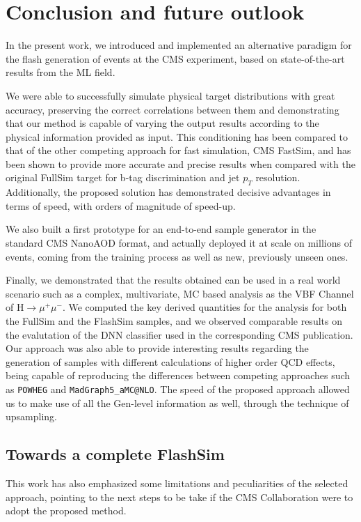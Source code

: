 \chapter{Conclusion and future outlook}\label{ch:outlook} %
In the present work, we introduced and implemented an alternative paradigm for the flash generation of events at the CMS experiment, based on state-of-the-art results from the ML field.

We were able to successfully simulate physical target distributions with great accuracy, preserving the correct correlations between them and demonstrating that our method is capable of varying the output results according to the physical information provided as input. This conditioning has been compared to that of the other competing approach for fast simulation, CMS FastSim, and has been shown to provide more accurate and precise results when compared with the original FullSim target for b-tag discrimination and jet $p_T$ resolution. Additionally, the proposed solution has demonstrated decisive advantages in terms of speed, with orders of magnitude of speed-up.

We also built a first prototype for an end-to-end sample generator in the standard CMS NanoAOD format, and actually deployed it at scale on millions of events, coming from the training process as well as new, previously unseen ones. 

Finally, we demonstrated that the results obtained can be used in a real world scenario such as a complex, multivariate, MC based analysis as the VBF Channel of H$\rightarrow\mu^+\mu^-$. We computed the key derived quantities for the analysis for both the FullSim and the FlashSim samples, and we observed comparable results on the evalutation of the DNN classifier used in the corresponding CMS publication.
Our approach was also able to provide interesting results regarding the generation of samples with different calculations of higher order QCD effects, being capable of reproducing the differences between competing approaches such as \texttt{POWHEG} and \texttt{MadGraph5\_aMC@NLO}. The speed of the proposed approach allowed us to make use of all the Gen-level information as well, through the technique of upsampling.

\section{Towards a complete FlashSim}
This work has also emphasized some limitations and peculiarities of the selected approach, pointing to the next steps to be take if the CMS Collaboration were to adopt the proposed method.

